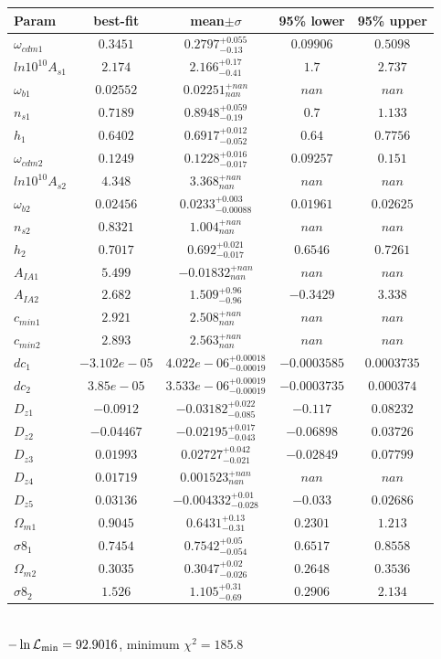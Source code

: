 \begin{tabular}{|l|c|c|c|c|} 
 \hline 
Param & best-fit & mean$\pm\sigma$ & 95\% lower & 95\% upper \\ \hline 
$\omega_{cdm 1 }$ &$0.3451$ & $0.2797_{-0.13}^{+0.055}$ & $0.09906$ & $0.5098$ \\ 
$ln10^{10}A_{s 1 }$ &$2.174$ & $2.166_{-0.41}^{+0.17}$ & $1.7$ & $2.737$ \\ 
$\omega_{b 1 }$ &$0.02552$ & $0.02251_{nan}^{+nan}$ & $nan$ & $nan$ \\ 
$n_{s 1 }$ &$0.7189$ & $0.8948_{-0.19}^{+0.059}$ & $0.7$ & $1.133$ \\ 
$h_{1 }$ &$0.6402$ & $0.6917_{-0.052}^{+0.012}$ & $0.64$ & $0.7756$ \\ 
$\omega_{cdm 2 }$ &$0.1249$ & $0.1228_{-0.017}^{+0.016}$ & $0.09257$ & $0.151$ \\ 
$ln10^{10}A_{s 2 }$ &$4.348$ & $3.368_{nan}^{+nan}$ & $nan$ & $nan$ \\ 
$\omega_{b 2 }$ &$0.02456$ & $0.0233_{-0.00088}^{+0.003}$ & $0.01961$ & $0.02625$ \\ 
$n_{s 2 }$ &$0.8321$ & $1.004_{nan}^{+nan}$ & $nan$ & $nan$ \\ 
$h_{2 }$ &$0.7017$ & $0.692_{-0.017}^{+0.021}$ & $0.6546$ & $0.7261$ \\ 
$A_{IA 1 }$ &$5.499$ & $-0.01832_{nan}^{+nan}$ & $nan$ & $nan$ \\ 
$A_{IA 2 }$ &$2.682$ & $1.509_{-0.96}^{+0.96}$ & $-0.3429$ & $3.338$ \\ 
$c_{min 1 }$ &$2.921$ & $2.508_{nan}^{+nan}$ & $nan$ & $nan$ \\ 
$c_{min 2 }$ &$2.893$ & $2.563_{nan}^{+nan}$ & $nan$ & $nan$ \\ 
$dc_{1 }$ &$-3.102e-05$ & $4.022e-06_{-0.00019}^{+0.00018}$ & $-0.0003585$ & $0.0003735$ \\ 
$dc_{2 }$ &$3.85e-05$ & $3.533e-06_{-0.00019}^{+0.00019}$ & $-0.0003735$ & $0.000374$ \\ 
$D_{z1 }$ &$-0.0912$ & $-0.03182_{-0.085}^{+0.022}$ & $-0.117$ & $0.08232$ \\ 
$D_{z2 }$ &$-0.04467$ & $-0.02195_{-0.043}^{+0.017}$ & $-0.06898$ & $0.03726$ \\ 
$D_{z3 }$ &$0.01993$ & $0.02727_{-0.021}^{+0.042}$ & $-0.02849$ & $0.07799$ \\ 
$D_{z4 }$ &$0.01719$ & $0.001523_{nan}^{+nan}$ & $nan$ & $nan$ \\ 
$D_{z5 }$ &$0.03136$ & $-0.004332_{-0.028}^{+0.01}$ & $-0.033$ & $0.02686$ \\ 
$\Omega_{m 1 }$ &$0.9045$ & $0.6431_{-0.31}^{+0.13}$ & $0.2301$ & $1.213$ \\ 
$\sigma8_{1 }$ &$0.7454$ & $0.7542_{-0.054}^{+0.05}$ & $0.6517$ & $0.8558$ \\ 
$\Omega_{m 2 }$ &$0.3035$ & $0.3047_{-0.026}^{+0.02}$ & $0.2648$ & $0.3536$ \\ 
$\sigma8_{2 }$ &$1.526$ & $1.105_{-0.69}^{+0.31}$ & $0.2906$ & $2.134$ \\ 
\hline 
 \end{tabular} \\ 
$-\ln{\cal L}_\mathrm{min} =92.9016$, minimum $\chi^2=185.8$ \\ 
